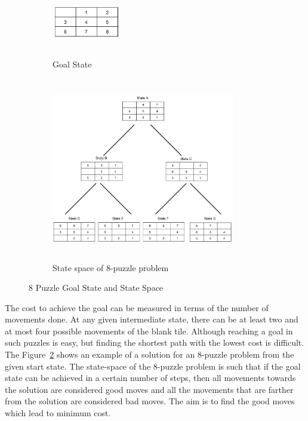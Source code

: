 \documentclass{svproc}
\begin{document}
\begin{figure}
	\centering
	\begin{subfigure}[b]{0.25\textwidth}
		\centering
		\includegraphics[width=3cm,height=3cm,keepaspectratio]{GoalState.png}
		\caption{Goal State}
		\label{fig:1a}		
	\end{subfigure}
	\begin{subfigure}[b]{0.6\textwidth}
		\centering
		\includegraphics[width=8cm,height=8cm,keepaspectratio]{ExampleState.png}
		\caption{State space of 8-puzzle problem}
		\label{fig:1b}
	\end{subfigure}
	\caption{8 Puzzle Goal State and State Space}
	\label{fig:1}
\end{figure}

\noindent The cost to achieve the goal can be measured in terms of the number of movements done. At any given intermediate state, there can be at least two and at most four possible movements of the blank tile. Although reaching a goal in such puzzles is easy, but finding the shortest path with the lowest cost is difficult. The Figure~\ref{fig:1b} shows an example of a solution for an 8-puzzle problem from the given start state. The state-space of the 8-puzzle problem is such that if the goal state can be achieved in a certain number of steps, then all movements towards the solution are considered good moves and all the movements that are farther from the solution are considered bad moves. The aim is to find the good moves which lead to minimum cost. \\
\end{document}
